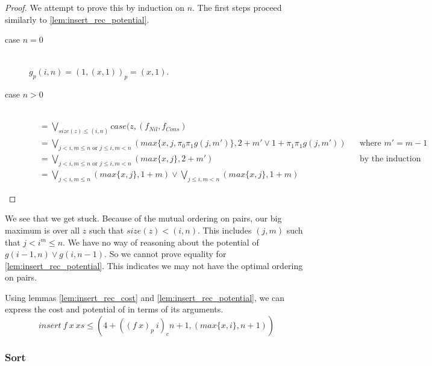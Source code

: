 \begin{proof}
  We attempt to prove this by induction on $n$.
  The first steps proceed similarly to \ref{lem:insert_rec_potential}.
  \begin{description}
    \item[case $n=0$]\hfill \\
      $g_p(i,n) = (1, (x, 1))_p = (x, 1)$.
    \item[case $n>0$]\hfill \\
      \begin{align*}
        &= \bigvee_{size(z) \leq (i,n)} case(z, (f_{Nil}, f_{Cons}) &&\\
        &= \bigvee_{j < i, m \leq n \text{ or } j \leq i, m < n} (max\{x, j, \pi_0\pi_1g(j, m')\}, 2 + m' \vee 1 + \pi_1\pi_1g(j, m')) && \text{where $m' = m - 1$}\\
        &= \bigvee_{j < i, m \leq n \text{ or } j \leq i, m < n} (max\{x, j\}, 2 + m')&&\text{by the induction hypothesis}\\
        &= \bigvee_{j < i, m \leq n} (max\{x, j\}, 1 + m) \vee \bigvee_{j \leq i, m < n} (max\{x, j\}, 1 + m)&&
      \end{align*}
  \end{description}
\end{proof}
%
We see that we get stuck.  Because of the mutual ordering on pairs, our big
maximum is over all $z$ such that $size(z) < (i, n)$.  This includes $(j, m)$
such that $j < i ^ m \leq n$.  We have no way of reasoning about the potential
of $g(i-1, n) \vee g(i, n -1)$.  So we cannot prove equality for
\ref{lem:insert_rec_potential}.  This indicates we may not have the optimal
ordering on pairs.

Using lemmas \ref{lem:insert_rec_cost} and \ref{lem:insert_rec_potential}, we
can express the cost and potential of  in terms of its arguments.
%
\begin{equation}
  \label{eq:insert_interp}
  insert\ f\ x\ xs \leq (4 + ((f\ x)_p\ i)_c n + 1, (max\{x, i\}, n+1))
\end{equation}
%

\subsubsection{Sort}
%
